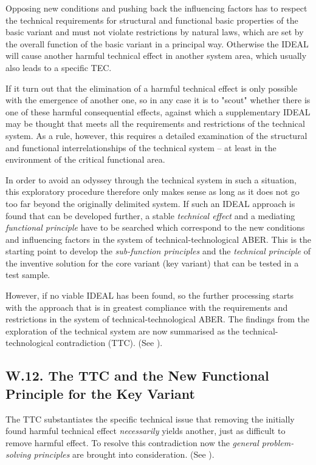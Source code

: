 \documentclass[11pt,a4paper]{article}
\begin{document}
Opposing new conditions and pushing back the influencing factors has to
respect the technical requirements for structural and functional basic
properties of the basic variant and must not violate restrictions by natural
laws, which are set by the overall function of the basic variant in a
principal way.  Otherwise the IDEAL will cause another harmful technical
effect in another system area, which usually also leads to a specific TEC.

If it turn out that the elimination of a harmful technical effect is only
possible with the emergence of another one, so in any case it is to "scout"
whether there is one of these harmful consequential effects, against which a
supplementary IDEAL may be thought that meets all the requirements and
restrictions of the technical system.  As a rule, however, this requires a
detailed examination of the structural and functional interrelationships of
the technical system -- at least in the environment of the critical functional
area.

In order to avoid an odyssey through the technical system in such a situation,
this exploratory procedure therefore only makes sense as long as it does not
go too far beyond the originally delimited system.  If such an IDEAL approach
is found that can be developed further, a stable \emph{technical effect} and a
mediating \emph{functional principle} have to be searched which correspond to
the new conditions and influencing factors in the system of
technical-technological ABER.  This is the starting point to develop the
\emph{sub-function principles} and the \emph{technical principle} of the
inventive solution for the core variant (key variant) that can be tested in a
test sample.

However, if no viable IDEAL has been found, so the further processing starts
with the approach that is in greatest compliance with the requirements and
restrictions in the system of technical-technological ABER. The findings from
the exploration of the technical system are now summarised as the
technical-technological contradiction (TTC). (See \cite[A.7]{RM-21}).

\subsection*{W.12. The TTC and the New Functional Principle for the Key
  Variant} 

The TTC substantiates the specific technical issue that removing the initially
found harmful technical effect \emph{necessarily} yields another, just as
difficult to remove harmful effect. To resolve this contradiction now the
\emph{general problem-solving principles} are brought into consideration. (See
\cite[A.9]{RM-21}).
\end{document}
